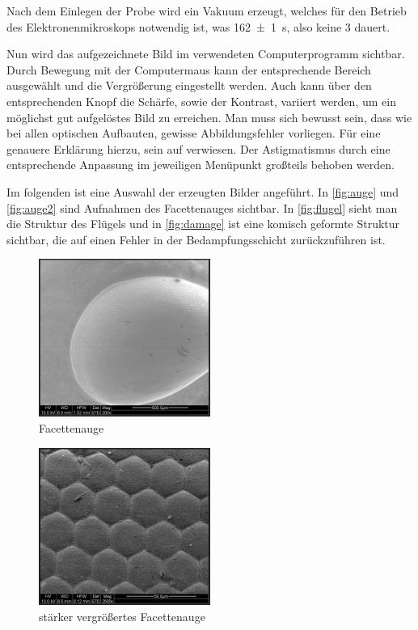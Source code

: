 \documentclass[12pt,english,ngerman]{scrartcl}
\begin{document}
Nach dem Einlegen der Probe wird ein Vakuum erzeugt, welches für den Betrieb des Elektronenmikroskops notwendig ist, was 
\SI{162(1)}{\s}, also keine \SI{3}{\min} dauert.

Nun wird das aufgezeichnete Bild im verwendeten Computerprogramm sichtbar. Durch Bewegung mit der Computermaus kann 
der entsprechende Bereich ausgewählt und die Vergrößerung eingestellt werden. Auch kann über den entsprechenden Knopf die 
Schärfe, sowie der Kontrast, variiert werden, um ein möglichst gut aufgelöstes Bild zu erreichen. Man muss sich bewusst 
sein, dass wie bei allen
optischen Aufbauten, gewisse Abbildungsfehler vorliegen. Für eine genauere Erklärung hierzu, sein auf \cite{unterlagen} 
verwiesen. Der Astigmatismus durch eine entsprechende Anpassung im jeweiligen Menüpunkt großteils behoben werden.



Im folgenden ist eine Auswahl der erzeugten Bilder angeführt. In \autoref{fig:auge} und \autoref{fig:auge2} sind Aufnahmen
des Facettenauges sichtbar. In \autoref{fig:flugel} sieht man die Struktur des Flügels und in \autoref{fig:damage} ist eine
komisch geformte Struktur sichtbar, die auf einen Fehler in der Bedampfungsschicht zurückzuführen ist.

\begin{figure}[H]
	\begin{center}
		\includegraphics[width =0.5\textwidth]{./figures/auge.png}
	\end{center}
	\caption{Facettenauge}
    \label{fig:auge}
\end{figure}

\begin{figure}[H]
	\begin{center}
		\includegraphics[width =0.5\textwidth]{./figures/auge2.png}
	\end{center}
	\caption{stärker vergrößertes Facettenauge}
    \label{fig:auge2}
\end{figure}
\end{document}
